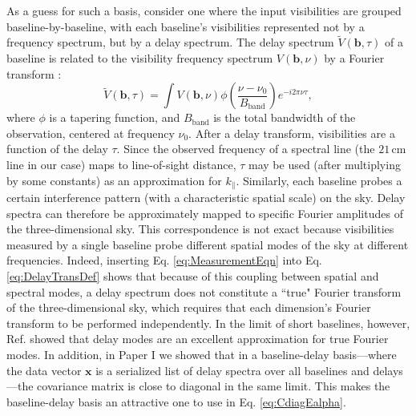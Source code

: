 \documentclass[twocolumn,aps,prd,nofootinbib,showpacs]{revtex4-1}
\begin{document}
As a guess for such a basis, consider one where the input visibilities are grouped baseline-by-baseline, with each baseline's visibilities represented not by a frequency spectrum, but by a delay spectrum.  The delay spectrum $\widetilde{V} (\mathbf{b}, \tau)$ of a baseline is related to the visibility frequency spectrum $V(\mathbf{b}, \nu)$ by a Fourier transform \cite{Parsons2012b}:
\begin{equation}
\label{eq:DelayTransDef}
\widetilde{V} (\mathbf{b}, \tau) = \int V(\mathbf{b}, \nu) \phi \left( \frac{\nu-\nu_0}{B_\textrm{band}} \right) e^{-i 2\pi \nu \tau},
\end{equation}
where $\phi$ is a tapering function, and $B_\textrm{band}$ is the total bandwidth of the observation, centered at frequency $\nu_0$.  After a delay transform, visibilities are a function of the delay $\tau$.  Since the observed frequency of a spectral line (the $21\,\textrm{cm}$ line in our case) maps to line-of-sight distance, $\tau$ may be used (after multiplying by some constants) as an approximation for $k_\parallel$.  Similarly, each baseline probes a certain interference pattern (with a characteristic spatial scale) on the sky.  Delay spectra can therefore be approximately mapped to specific Fourier amplitudes of the three-dimensional sky.  This correspondence is not exact because visibilities measured by a single baseline probe different spatial modes of the sky at different frequencies.  Indeed, inserting Eq. \eqref{eq:MeasurementEqn} into Eq. \eqref{eq:DelayTransDef} shows that because of this coupling between spatial and spectral modes, a delay spectrum does not constitute a ``true" Fourier transform of the three-dimensional sky, which requires that each dimension's Fourier transform to be performed independently.  In the limit of short baselines, however, Ref. \cite{Parsons2012b} showed that delay modes are an excellent approximation for true Fourier modes.  In addition, in Paper I we showed that in a baseline-delay basis---where the data vector $\mathbf{x}$ is a serialized list of delay spectra over all baselines and delays---the covariance matrix is close to diagonal in the same limit.  This makes the baseline-delay basis an attractive one to use in Eq. \eqref{eq:CdiagEalpha}.
%
%
%
\end{document}
